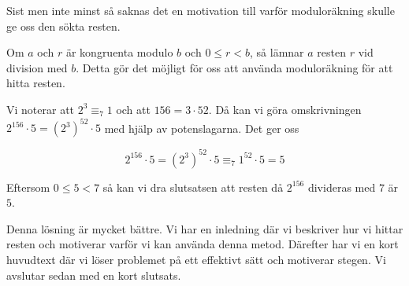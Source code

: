 \documentclass[titlepage]{article}
\begin{document}
Sist men inte minst så saknas det en motivation till varför moduloräkning skulle ge oss den sökta resten. 


\begin{center}
    \begin{tcolorbox}[width=\linewidth,colback={green!25!white},title={\textbf{Lösning 3 - Bättre}},outer arc=0mm,colupper=black]
        Om $a$ och $r$ är kongruenta modulo $b$ och $0\leq r<b$, så lämnar $a$ resten $r$ vid division med $b$. Detta gör det möjligt för oss att använda moduloräkning för att hitta resten. \vspace{2mm}

        Vi noterar att $2^3 \equiv_7 1$ och att $156 = 3\cdot 52$. Då kan vi göra omskrivningen $2^{156}\cdot 5 = (2^3)^{52} \cdot 5$ med hjälp av potenslagarna. Det ger oss

        $$2^{156}\cdot 5 = (2^3)^{52} \cdot 5 \equiv_7 1^{52} \cdot 5 = 5$$

        Eftersom $0\leq 5<7$ så kan vi dra slutsatsen att resten då $2^{156}$ divideras med $7$ är $5$.
    \end{tcolorbox} 
    \end{center}

Denna lösning är mycket bättre. Vi har en inledning där vi beskriver hur vi hittar resten och motiverar varför vi kan använda denna metod. Därefter har vi en kort huvudtext där vi löser problemet på ett effektivt sätt och motiverar stegen. Vi avslutar sedan med en kort slutsats.


\end{document}
